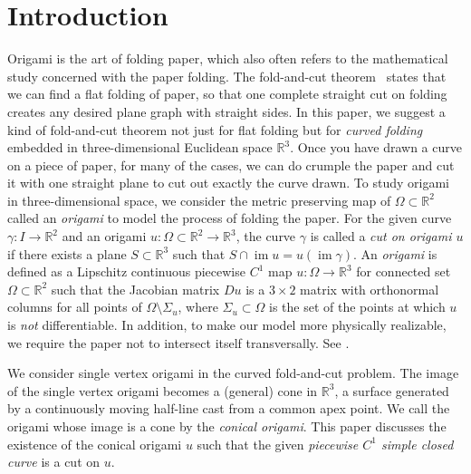 \documentclass{amsart}
\theoremstyle{plain}
\theoremstyle{definition}
\theoremstyle{remark}
\DeclareMathOperator{\im}{im}
\begin{document}
\section{Introduction}%
Origami is the art of folding paper, which also often refers to the mathematical study concerned with the paper folding.
The fold-and-cut theorem~\cite{demaine2000folding} states that we can find a flat folding of paper, 
so that one complete straight cut on folding creates any desired plane graph with straight sides.
In this paper, we suggest a kind of fold-and-cut theorem not just for flat folding but for \emph{curved folding} embedded in three-dimensional Euclidean space $\mathbb{R}^3$.
Once you have drawn a curve on a piece of paper, for many of the cases, we can do crumple the paper and cut it with one straight plane to cut out exactly the curve drawn.
To study origami in three-dimensional space, we consider the metric preserving map of ${\Omega\subset\mathbb R}^2$ called an \emph{origami} to model the process of folding the paper.
For the given curve $\gamma \colon I\to\mathbb{R}^2$ and an origami $u \colon \Omega \subset \mathbb{R}^2\to\mathbb{R}^3$, 
the curve $\gamma$ is called a \emph{cut on origami $u$} if there exists a plane $S\subset\mathbb{R}^3$ such that $S\cap\im u=u(\im\gamma)$.
An \emph{origami} is defined as a Lipschitz continuous piecewise $C^1$ map $u \colon \Omega\to\mathbb{R}^3$ for connected set $\Omega\subset\mathbb{R}^2$ such that 
the Jacobian matrix $Du$ is a $3\times 2$ matrix with orthonormal columns for all points of $\Omega\setminus\Sigma_u$, 
where $\Sigma_u\subset\Omega$ is the set of the points at which $u$ is \emph{not} differentiable. 
In addition, to make our model more physically realizable, we require the paper not to intersect itself transversally.
See \cite{dacorogna2008lipschitz}.

We consider single vertex origami in the curved fold-and-cut problem.
The image of the single vertex origami becomes a (general) cone in $\mathbb{R}^3$, 
a surface generated by a continuously moving half-line cast from a common apex point.
We call the origami whose image is a cone by the \emph{conical origami}.
This paper discusses the existence of the conical origami $u$ such that the given \emph{piecewise $C^1$ simple closed curve} is a cut on $u$.
\end{document}
